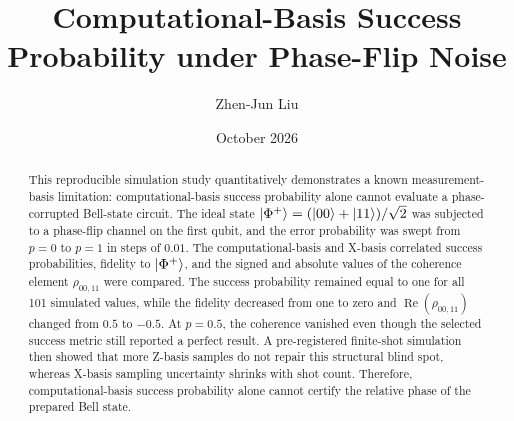 \documentclass[a4paper,10pt]{article}
\title{Computational-Basis Success Probability under Phase-Flip Noise}
\author{Zhen-Jun Liu}
\date{October 2026}
\begin{document}
\maketitle

\begin{abstract}
This reproducible simulation study quantitatively demonstrates a known
measurement-basis limitation: computational-basis success probability alone
cannot evaluate a phase-corrupted Bell-state circuit.  The ideal
state $\ket{\Phi^+}=(\ket{00}+\ket{11})/\sqrt{2}$ was subjected to a phase-flip
channel on the first qubit, and the error probability was swept from $p=0$ to
$p=1$ in steps of $0.01$.  The computational-basis and X-basis correlated
success probabilities, fidelity to $\ket{\Phi^+}$, and the signed and absolute values of the coherence
element $\rho_{00,11}$ were compared.  The success probability remained equal
to one for all 101 simulated values, while the fidelity decreased from one to
zero and $\operatorname{Re}(\rho_{00,11})$ changed from $0.5$ to $-0.5$.  At
$p=0.5$, the coherence vanished even though the selected success metric still
reported a perfect result.  A pre-registered finite-shot simulation then
showed that more Z-basis samples do not repair this structural blind spot,
whereas X-basis sampling uncertainty shrinks with shot count.  Therefore,
computational-basis success probability alone cannot certify the relative
phase of the prepared Bell state.
\end{abstract}
\end{document}
